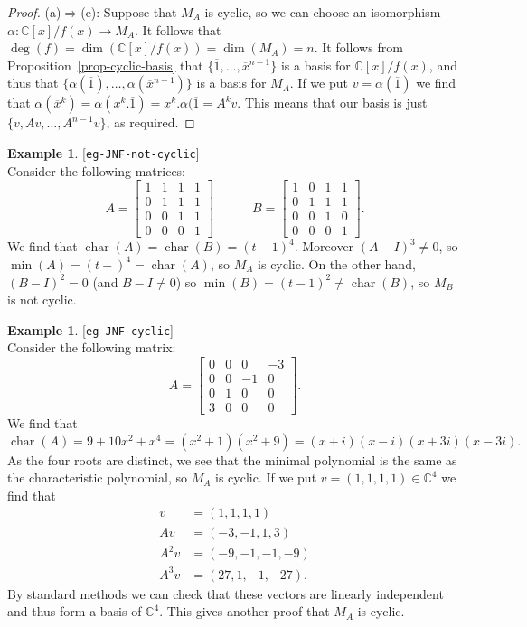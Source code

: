 \documentclass{amsart}
\newcommand{\lbl}[1]{\label{#1}\textup{[\texttt{#1}]}\ \\}
\newcommand{\lbl}{\label}
\newcommand{\bbm}       {\left[\begin{matrix}}
\newcommand{\ebm}       {\end{matrix}\right]}
\newcommand{\chr}       {\operatorname{char}}
\newcommand{\C}         {{\mathbb{C}}}
\newcommand{\al}        {\alpha}
\newcommand{\ov}[1]     {\overline{#1}}
\newcommand{\xra}       {\xrightarrow}
\renewcommand{\:}{\colon}
\theoremstyle{definition}
\newtheorem{example}[theorem]{Example}
\begin{document}
\begin{proof}
 (a)$\Rightarrow$(e): Suppose that $M_A$ is cyclic, so we can choose
  an isomorphism $\al\:\C[x]/f(x)\xra{}M_A$.  It follows that
  $\deg(f)=\dim(\C[x]/f(x))=\dim(M_A)=n$.  It follows from
  Proposition~\ref{prop-cyclic-basis} that
  $\{\ov{1},\ldots,\ov{x}^{n-1}\}$ is a basis for $\C[x]/f(x)$, and
  thus that $\{\al(\ov{1}),\ldots,\al(\ov{x}^{n-1})\}$ is a basis for
  $M_A$.  If we put $v=\al(\ov{1})$ we find that
  $\al(\ov{x}^k)=\al(x^k.\ov{1})=x^k.\al(\ov{1}=A^kv$.  This means
  that our basis is just $\{v,Av,\ldots,A^{n-1}v\}$, as required.
\end{proof}
 
\begin{example}\lbl{eg-JNF-not-cyclic}
 Consider the following matrices:
 \[ A = \bbm 1&1&1&1\\0&1&1&1\\0&0&1&1\\0&0&0&1 \ebm \hspace{3em}
    B = \bbm 1&0&1&1\\0&1&1&1\\0&0&1&0\\0&0&0&1 \ebm.
 \]
 We find that $\chr(A)=\chr(B)=(t-1)^4$.  Moreover $(A-I)^3\neq 0$, so
 $\min(A)=(t-)^4=\chr(A)$, so $M_A$ is cyclic.  On the other hand,
 $(B-I)^2=0$ (and $B-I\neq 0$) so $\min(B)=(t-1)^2\neq\chr(B)$, so
 $M_B$ is not cyclic.
\end{example}
\begin{example}\lbl{eg-JNF-cyclic}
 Consider the following matrix:
 \[ A = \bbm 0&0&0&-3\\0&0&-1&0\\0&1&0&0\\3&0&0&0 \ebm. \]
 We find that 
 \[ \chr(A)=9+10x^2+x^4=(x^2+1)(x^2+9)=(x+i)(x-i)(x+3i)(x-3i). \]
 As the four roots are distinct, we see that the minimal polynomial is
 the same as the characteristic polynomial, so $M_A$ is cyclic.  If we
 put $v=(1,1,1,1)\in\C^4$ we find that 
 \begin{align*}
  v    &= (1,1,1,1) \\
  Av   &= (-3,-1,1,3) \\
  A^2v &= (-9,-1,-1,-9) \\
  A^3v &= (27,1,-1,-27).
 \end{align*}
 By standard methods we can check that these vectors are linearly
 independent and thus form a basis of $\C^4$.  This gives another
 proof that $M_A$ is cyclic.
\end{example}
\end{document}

